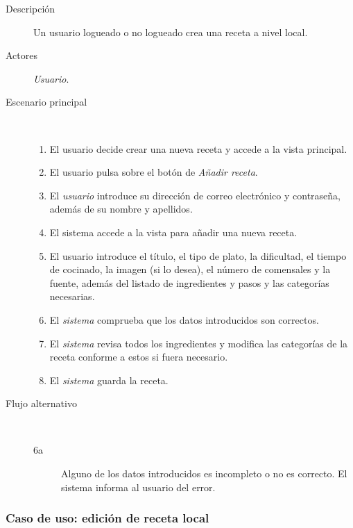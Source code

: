 \begin{description}
\item[Descripción] Un usuario logueado o no logueado crea una receta a nivel
local.
\item[Actores] \textit{Usuario}.
\item[Escenario principal] $\quad$
  \begin{enumerate}
  \item El usuario decide crear una nueva receta y accede a la vista principal.
  \item El usuario pulsa sobre el botón de \textit{Añadir receta}.
  \item El \textit{usuario} introduce su dirección de correo electrónico y
  contraseña, además de su nombre y apellidos.
  \item El sistema accede a la vista para añadir una nueva receta.
  \item El usuario introduce el título, el tipo de plato, la dificultad, el
  tiempo de cocinado, la imagen (si lo desea), el número de comensales y la
  fuente, además del listado de ingredientes y pasos y las categorías necesarias.
  \item El \textit{sistema} comprueba que los datos introducidos son correctos.
  \item El \textit{sistema} revisa todos los ingredientes y modifica las
  categorías de la receta conforme a estos si fuera necesario.
  \item El \textit{sistema} guarda la receta.
  \end{enumerate}
\item[Flujo alternativo] $\quad$
  \begin{description}
  \item[6a] Alguno de los datos introducidos es incompleto o no es correcto. El
    sistema informa al usuario del error.
  \end{description}
\end{description}


\subsubsection{Caso de uso: edición de receta local}

